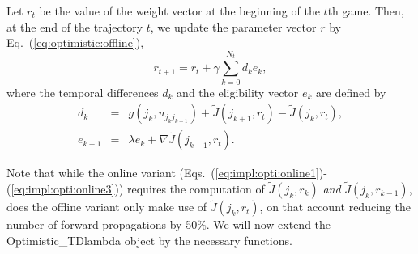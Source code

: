 Let $r_t$ be the value of the weight vector at the beginning of the $t$th game. Then, at the end of the trajectory $t$, we update the parameter vector $r$ by Eq.~(\ref{eq:optimistic:offline}),
\begin{equation} \label{eq:impl:opti:off:r}
r_{t+1} = r_t + \gamma \sum \limits_{k=0}^{N_t} d_k e_k,
\end{equation}
where the temporal differences $d_k$ and the eligibility vector $e_k$ are defined by
\begin{eqnarray} 
\label{eq:impl:opti:off:d} d_k & =&  g(j_k,u_{j_kj_{k+1}}) + \tilde J(j_{k+1},r_t) - \tilde J(j_k,r_t), \\
\label{eq:impl:opti:off:e} e_{k+1} & =&  \lambda e_{k} + \nabla \tilde J(j_{k+1},r_t).
\end{eqnarray}

Note that while the online variant (Eqs.~(\ref{eq:impl:opti:online1})-(\ref{eq:impl:opti:online3})) requires the computation of $\tilde J(j_k,r_k)$ \emph{and} $\tilde J(j_k,r_{k-1})$, does the offline variant only make use of $\tilde J(j_k,r_t)$, on that account reducing the number of forward propagations by 50\%. 
We will now extend the {\al Optimistic\_TDlambda} object by the necessary functions.

